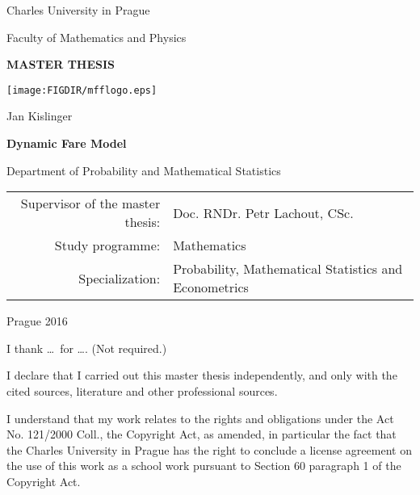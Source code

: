 \pagestyle{empty}
\begin{center}

{\large Charles University in Prague}

\medskip
{\large Faculty of Mathematics and Physics}

\vfill
{\bfseries\Large MASTER THESIS}

\vfill
\centerline{\mbox{\texttt{[image: \\FIGDIR/mfflogo.eps]}}}

\vfill
\vspace{5mm}

{\LARGE Jan Kislinger}

\vspace{15mm}

{\LARGE\bfseries Dynamic Fare Model}

\vfill

Department of Probability and Mathematical Statistics

\vfill

\begin{tabular}{rl}
Supervisor of the master thesis: & Doc. RNDr. Petr Lachout, CSc. \\   
\noalign{\vspace{2mm}}
Study programme: & Mathematics\\
\noalign{\vspace{2mm}}
Specialization: & Probability, Mathematical Statistics and Econometrics\\
\end{tabular}

\vfill

Prague 2016

\end{center}




\newpage
\openright

\noindent
I thank \dots\ for \dots. (Not required.)




\newpage

\noindent
I declare that I carried out this master thesis independently, and only with the cited
sources, literature and other professional sources.

\medskip\noindent
I understand that my work relates to the rights and obligations under the Act No.
121/2000 Coll., the Copyright Act, as amended, in particular the fact that the Charles
University in Prague has the right to conclude a license agreement on the use of this
work as a school work pursuant to Section 60 paragraph 1 of the Copyright Act.


